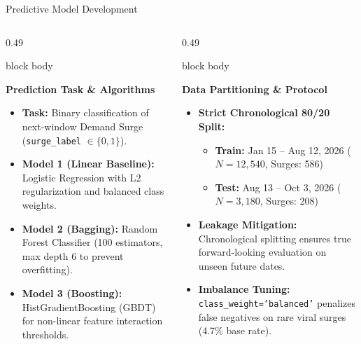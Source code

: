 \documentclass[aspectratio=169, 10pt]{beamer}
\newenvironment{card}[1][]{%
    \begin{beamercolorbox}[rounded=true,shadow=false,wd=\linewidth,sep=4pt,#1]{block body}%
}{%
    \end{beamercolorbox}%
}
\begin{document}
\begin{frame}{Predictive Model Development}
    \begin{columns}[T]
        \begin{column}{0.49\textwidth}
            \begin{card}
                {\fontsize{8.5pt}{10pt}\selectfont \textbf{\color{NavyPrimary}Prediction Task \& Algorithms}}\\[0.08cm]
                \begin{itemize}\setlength{\itemsep}{2pt}
                    \item \textbf{Task:} Binary classification of next-window Demand Surge (\texttt{surge\_label} $\in \{0, 1\}$).
                    \item \textbf{Model 1 (Linear Baseline):} Logistic Regression with L2 regularization and balanced class weights.
                    \item \textbf{Model 2 (Bagging):} Random Forest Classifier (100 estimators, max depth 6 to prevent overfitting).
                    \item \textbf{Model 3 (Boosting):} HistGradientBoosting (GBDT) for non-linear feature interaction thresholds.
                \end{itemize}
            \end{card}
        \end{column}

        \begin{column}{0.49\textwidth}
            \begin{card}
                {\fontsize{8.5pt}{10pt}\selectfont \textbf{\color{NavyPrimary}Data Partitioning \& Protocol}}\\[0.08cm]
                \begin{itemize}\setlength{\itemsep}{2pt}
                    \item \textbf{Strict Chronological 80/20 Split:}
                        \begin{itemize}\setlength{\itemsep}{1pt}
                            \item \textbf{Train:} Jan 15 -- Aug 12, 2026 ($N = 12,540$, Surges: 586)
                            \item \textbf{Test:} Aug 13 -- Oct 3, 2026 ($N = 3,180$, Surges: 208)
                        \end{itemize}
                    \item \textbf{Leakage Mitigation:} Chronological splitting ensures true forward-looking evaluation on unseen future dates.
                    \item \textbf{Imbalance Tuning:} \texttt{class\_weight='balanced'} penalizes false negatives on rare viral surges (4.7\% base rate).
                \end{itemize}
            \end{card}
        \end{column}
    \end{columns}
\end{frame}
\end{document}
